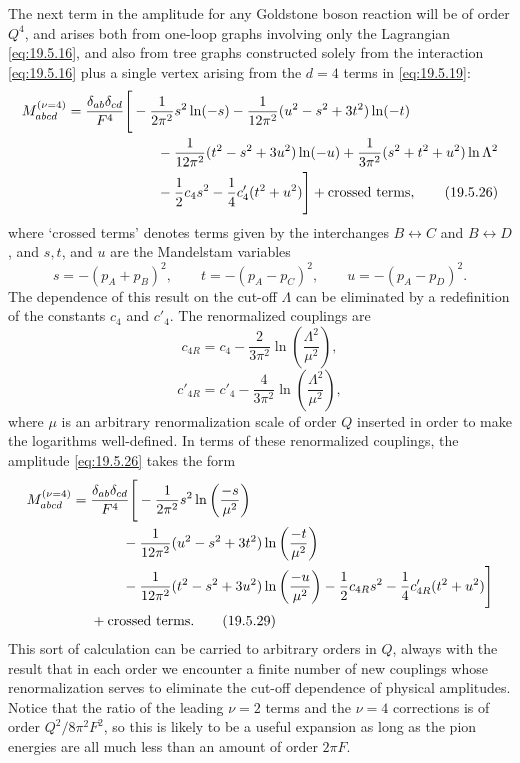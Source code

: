 The next term in the amplitude for any Goldstone boson reaction will be of order $Q^4$, and arises both from one-loop graphs involving only the Lagrangian \eqref{eq:19.5.16}, and also from tree graphs constructed solely from the interaction \eqref{eq:19.5.16} plus a single vertex arising from the $d=4$ terms in \eqref{eq:19.5.19}:
\begin{align}
M_{abcd}^{(\nu=4)}
={}&\frac{\delta_{ab}\delta_{cd}}{F^4}
\Bigg[
-\frac{1}{2\pi^2}s^2\ln(-s)
-\frac{1}{12\pi^2}(u^2-s^2+3t^2)\ln(-t)
\notag\\
&\hspace{1.8cm}
-\frac{1}{12\pi^2}(t^2-s^2+3u^2)\ln(-u)
+\frac{1}{3\pi^2}(s^2+t^2+u^2)\ln\Lambda^2
\notag\\
&\hspace{1.8cm}
-\frac{1}{2}c_4s^2-\frac{1}{4}c'_4(t^2+u^2)
\Bigg]
+\text{crossed terms},
\tag{19.5.26}\label{eq:19.5.26}
\end{align}
where `crossed terms' denotes terms given by the interchanges $B\leftrightarrow C$ and $B\leftrightarrow D$, and $s,t$, and $u$ are the Mandelstam variables
\[
s=-(p_A+p_B)^2,\qquad
t=-(p_A-p_C)^2,\qquad
u=-(p_A-p_D)^2.
\]
The dependence of this result on the cut-off $\Lambda$ can be eliminated by a redefinition of the constants $c_4$ and $c'_4$. The renormalized couplings are
\begin{equation}
c_{4R}=c_4-\frac{2}{3\pi^2}\ln\left(\frac{\Lambda^2}{\mu^2}\right),
\tag{19.5.27}\label{eq:19.5.27}
\end{equation}
\begin{equation}
c'_{4R}=c'_4-\frac{4}{3\pi^2}\ln\left(\frac{\Lambda^2}{\mu^2}\right),
\tag{19.5.28}\label{eq:19.5.28}
\end{equation}
where $\mu$ is an arbitrary renormalization scale of order $Q$ inserted in order to make the logarithms well-defined. In terms of these renormalized couplings, the amplitude \eqref{eq:19.5.26} takes the form
\begin{align}
M_{abcd}^{(\nu=4)}
={}&\frac{\delta_{ab}\delta_{cd}}{F^4}
\Bigg[
-\frac{1}{2\pi^2}s^2\ln\left(\frac{-s}{\mu^2}\right)
\notag\\
&\hspace{0.8cm}
-\frac{1}{12\pi^2}(u^2-s^2+3t^2)
\ln\left(\frac{-t}{\mu^2}\right)
\notag\\
&\hspace{0.8cm}
-\frac{1}{12\pi^2}(t^2-s^2+3u^2)
\ln\left(\frac{-u}{\mu^2}\right)
-\frac{1}{2}c_{4R}s^2-\frac{1}{4}c'_{4R}(t^2+u^2)
\Bigg]
\notag\\
&+\text{crossed terms}.
\tag{19.5.29}\label{eq:19.5.29}
\end{align}
This sort of calculation can be carried to arbitrary orders in $Q$, always with the result that in each order we encounter a finite number of new couplings whose renormalization serves to eliminate the cut-off dependence of physical amplitudes. Notice that the ratio of the leading $\nu=2$ terms and the $\nu=4$ corrections is of order $Q^2/8\pi^2F^2$, so this is likely to be a useful expansion as long as the pion energies are all much less than an amount of order $2\pi F$.

